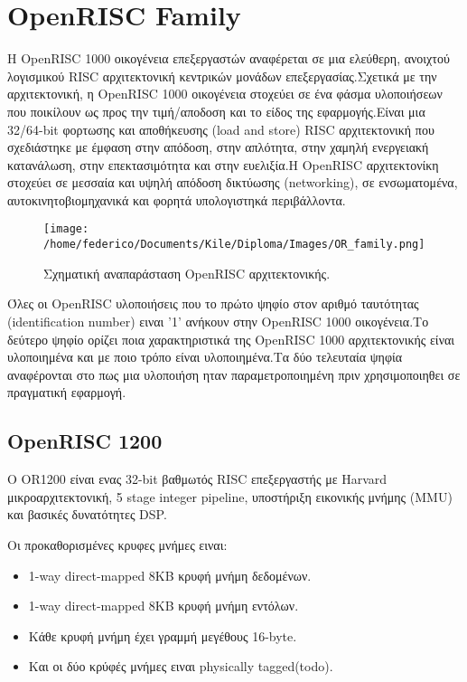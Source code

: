 \documentclass[a4paper,10pt]{article}
\begin{document}

\newpage
\tableofcontents
\newpage

\section{OpenRISC Family}
{Η OpenRISC 1000 οικογένεια επεξεργαστών αναφέρεται σε μια ελεύθερη, ανοιχτού
λογισμικού RISC αρχιτεκτονική κεντρικών μονάδων επεξεργασίας.Σχετικά με την
αρχιτεκτονική, η OpenRISC 1000 οικογένεια στοχεύει σε ένα φάσμα υλοποιήσεων που	
ποικίλουν ως προς την τιμή/αποδοση και το είδος της εφαρμογής.Είναι μια 
32/64-bit φορτωσης και αποθήκευσης (load and store) RISC αρχιτεκτονική που σχεδιάστηκε
με έμφαση στην απόδοση, στην απλότητα, στην χαμηλή ενεργειακή κατανάλωση, στην επεκτασιμότητα
και στην ευελιξία.Η OpenRISC αρχιτεκτονίκη στοχεύει σε μεσσαία και υψηλή απόδοση
δικτύωσης (networking), σε ενσωματομένα, αυτοκινητοβιομηχανικά και φορητά υπολογιστηκά περιβάλλοντα.

\vspace{0.7cm}
\begin{figure}[h!]
 \centering
 \texttt{[image: /home/federico/Documents/Kile/Diploma/Images/OR\_family.png]}
 \caption{Σχηματική αναπαράσταση OpenRISC αρχιτεκτονικής.}
\end{figure}
\vspace{0.7cm}


Όλες οι OpenRISC υλοποιήσεις που το πρώτο ψηφίο στον αριθμό ταυτότητας
(identification number) ειναι '1' ανήκουν στην 
OpenRISC 1000 οικογένεια.Το δεύτερο ψηφίο ορίζει ποια χαρακτηριστικά της OpenRISC
1000 αρχιτεκτονικής είναι υλοποιημένα και με ποιο τρόπο είναι υλοποιημένα.Τα δύο
τελευταία ψηφία αναφέρονται στο πως μια υλοποιήση ηταν παραμετροποιημένη πριν 
χρησιμοποιηθει σε πραγματική εφαρμογή.
\subsection{OpenRISC 1200}
{ Ο OR1200 είναι ενας 32-bit βαθμωτός RISC επεξεργαστής με Harvard μικροαρχιτεκτονική,
5 stage integer pipeline, υποστήριξη εικονικής μνήμης (MMU) και βασικές δυνατότητες
DSP.

Οι προκαθορισμένες κρυφες μνήμες ειναι:
\begin{itemize}
 \item 1-way direct-mapped 8KB κρυφή μνήμη δεδομένων.
 \item 1-way direct-mapped 8KB κρυφή μνήμη εντόλων.
 \item Κάθε κρυφή μνήμη έχει γραμμή μεγέθους 16-byte.
 \item Και οι δύο κρύφές μνήμες ειναι  physically tagged(todo).
\end{itemize}

}}
\end{document}
